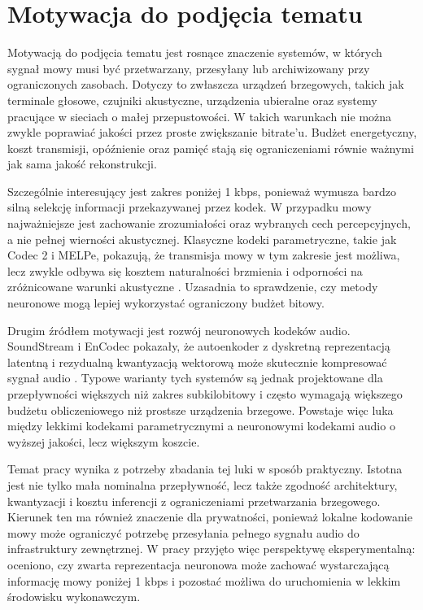 \section{Motywacja do podjęcia tematu}
\label{sec:motywacja}

Motywacją do podjęcia tematu jest rosnące znaczenie systemów, w których sygnał mowy musi być przetwarzany, przesyłany lub archiwizowany przy ograniczonych zasobach. Dotyczy to zwłaszcza urządzeń brzegowych, takich jak terminale głosowe, czujniki akustyczne, urządzenia ubieralne oraz systemy pracujące w sieciach o małej przepustowości. W takich warunkach nie można zwykle poprawiać jakości przez proste zwiększanie bitrate'u. Budżet energetyczny, koszt transmisji, opóźnienie oraz pamięć stają się ograniczeniami równie ważnymi jak sama jakość rekonstrukcji.

Szczególnie interesujący jest zakres poniżej 1 kbps, ponieważ wymusza bardzo silną selekcję informacji przekazywanej przez kodek. W przypadku mowy najważniejsze jest zachowanie zrozumiałości oraz wybranych cech percepcyjnych, a nie pełnej wierności akustycznej. Klasyczne kodeki parametryczne, takie jak Codec 2 i MELPe, pokazują, że transmisja mowy w tym zakresie jest możliwa, lecz zwykle odbywa się kosztem naturalności brzmienia i odporności na zróżnicowane warunki akustyczne \cite{Rowe2019Codec2,Rowe2021Codec2450,NATO2015STANAG4591}. Uzasadnia to sprawdzenie, czy metody neuronowe mogą lepiej wykorzystać ograniczony budżet bitowy.

Drugim źródłem motywacji jest rozwój neuronowych kodeków audio. SoundStream i EnCodec pokazały, że autoenkoder z dyskretną reprezentacją latentną i rezydualną kwantyzacją wektorową może skutecznie kompresować sygnał audio \cite{Zeghidour2021SoundStream,Defossez2022Encodec}. Typowe warianty tych systemów są jednak projektowane dla przepływności większych niż zakres subkilobitowy i często wymagają większego budżetu obliczeniowego niż prostsze urządzenia brzegowe. Powstaje więc luka między lekkimi kodekami parametrycznymi a neuronowymi kodekami audio o wyższej jakości, lecz większym koszcie.

Temat pracy wynika z potrzeby zbadania tej luki w sposób praktyczny. Istotna jest nie tylko mała nominalna przepływność, lecz także zgodność architektury, kwantyzacji i kosztu inferencji z ograniczeniami przetwarzania brzegowego. Kierunek ten ma również znaczenie dla prywatności, ponieważ lokalne kodowanie mowy może ograniczyć potrzebę przesyłania pełnego sygnału audio do infrastruktury zewnętrznej. W pracy przyjęto więc perspektywę eksperymentalną: oceniono, czy zwarta reprezentacja neuronowa może zachować wystarczającą informację mowy poniżej 1 kbps i pozostać możliwa do uruchomienia w lekkim środowisku wykonawczym.

